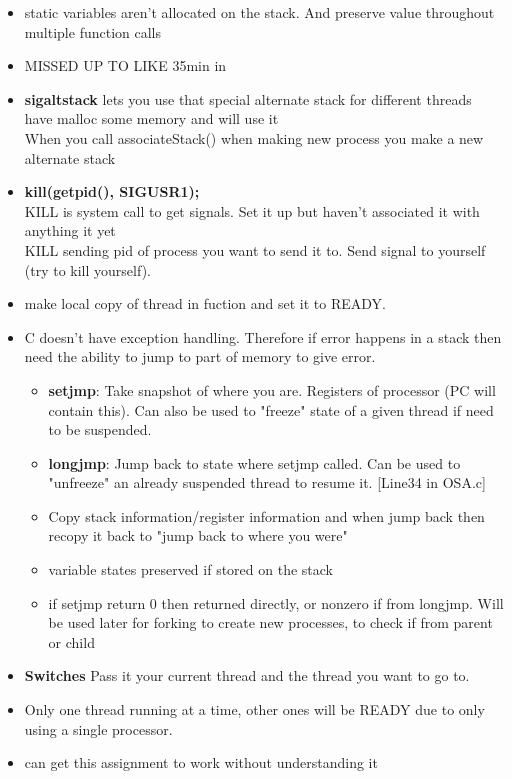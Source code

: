 \documentclass{article}
\newcommand\tab[1][0.5cm]{\hspace*{#1}}
\begin{document}
\begin{itemize}
		\item static variables aren't allocated on the stack. And preserve value throughout multiple function calls

		\item MISSED UP TO LIKE 35min in

		\item \textbf{sigaltstack} lets you use that special alternate stack for different threads
		\\ \tab have malloc some memory and will use it
		\\ \tab When you call associateStack() when making new process you make a new alternate stack

		\item \textbf{kill(getpid(), SIGUSR1);}
		\\ \tab KILL is system call to get signals. Set it up but haven't associated it with anything it yet
		\\ \tab KILL sending pid of process you want to send it to. Send signal to yourself (try to kill yourself).

		\item make local copy of thread in fuction and set it to READY.

		\item C doesn't have exception handling. Therefore if error happens in a stack then need the ability to jump to part of memory to give error.
		\begin{itemize}
			\item \textbf{setjmp}: Take snapshot of where you are. Registers of processor (PC will contain this). Can also be used to "freeze" state of a given thread if need to be suspended.
			\item \textbf{longjmp}: Jump back to state where setjmp called. Can be used to "unfreeze" an already suspended thread to resume it. [Line34 in OSA.c]
			\item Copy stack information/register information and when jump back then recopy it back to "jump back to where you were"
			\item variable states preserved if stored on the stack
			\item if setjmp return 0 then returned directly, or nonzero if from longjmp. Will be used later for forking to create new processes, to check if from parent or child
		\end{itemize}

		\item \textbf{Switches} Pass it your current thread and the thread you want to go to.

		\item Only one thread running at a time, other ones will be READY due to only using a single processor.



		\item can get this assignment to work without understanding it
	\end{itemize}
\end{document}
